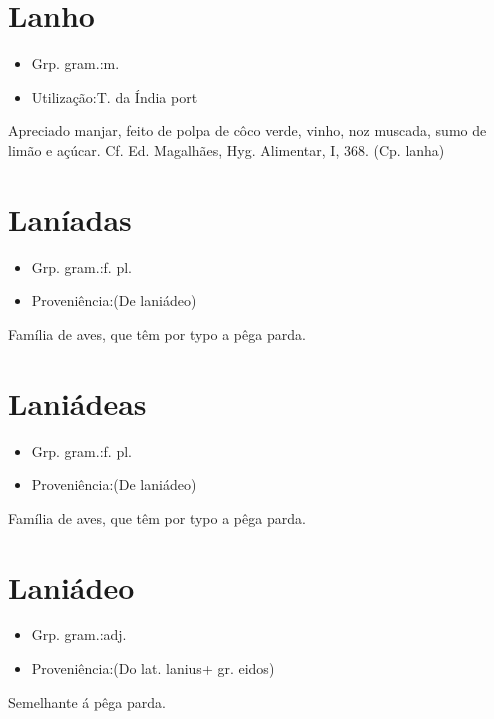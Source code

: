 \section{Lanho}
\begin{itemize}
\item {Grp. gram.:m.}
\end{itemize}
\begin{itemize}
\item {Utilização:T. da Índia port}
\end{itemize}
Apreciado manjar, feito de polpa de côco verde, vinho, noz muscada, sumo de limão e açúcar. Cf. Ed. Magalhães, \textunderscore Hyg. Alimentar\textunderscore , I, 368.
(Cp. \textunderscore lanha\textunderscore )
\section{Laníadas}
\begin{itemize}
\item {Grp. gram.:f. pl.}
\end{itemize}
\begin{itemize}
\item {Proveniência:(De \textunderscore laniádeo\textunderscore )}
\end{itemize}
Família de aves, que têm por typo a pêga parda.
\section{Laniádeas}
\begin{itemize}
\item {Grp. gram.:f. pl.}
\end{itemize}
\begin{itemize}
\item {Proveniência:(De \textunderscore laniádeo\textunderscore )}
\end{itemize}
Família de aves, que têm por typo a pêga parda.
\section{Laniádeo}
\begin{itemize}
\item {Grp. gram.:adj.}
\end{itemize}
\begin{itemize}
\item {Proveniência:(Do lat. \textunderscore lanius\textunderscore  + gr. \textunderscore eidos\textunderscore )}
\end{itemize}
Semelhante á pêga parda.
